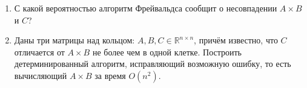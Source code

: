 \documentclass[11pt]{article}
\newenvironment{exercise}{\item}{}
\begin{document}
\begin{enumerate}
\begin{exercise}
С какой вероятностью алгоритм Фрейвальдса сообщит о несовпадении $A \times B$ и $C$?
\end{exercise}

\begin{exercise}
Даны три матрицы над кольцом: $A, B, C \in \mathbb{R}^{n \times n}$,
причём известно, что $C$ отличается от $A \times B$ не более чем в одной клетке.
Построить детерминированный алгоритм, исправляющий возможную ошибку,
то есть вычисляющий $A \times B$ за время $O(n^2)$.
\end{exercise}



\end{enumerate}
\end{document}

